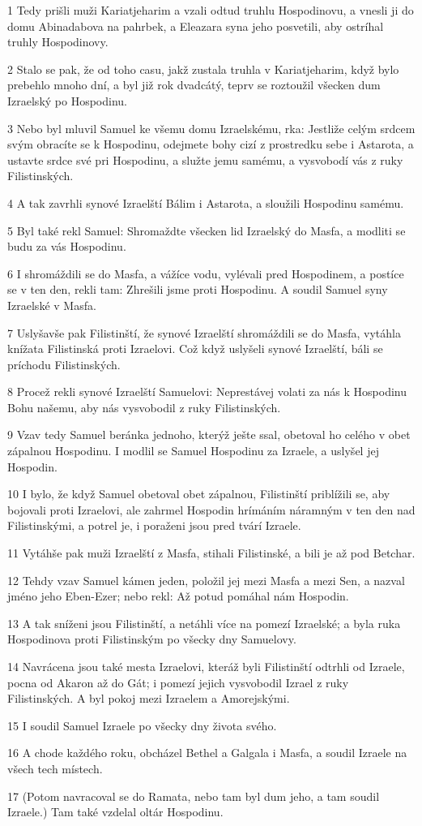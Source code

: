 \par 1 Tedy prišli muži Kariatjeharim a vzali odtud truhlu Hospodinovu, a vnesli ji do domu Abinadabova na pahrbek, a Eleazara syna jeho posvetili, aby ostríhal truhly Hospodinovy.
\par 2 Stalo se pak, že od toho casu, jakž zustala truhla v Kariatjeharim, když bylo prebehlo mnoho dní, a byl již rok dvadcátý, teprv se roztoužil všecken dum Izraelský po Hospodinu.
\par 3 Nebo byl mluvil Samuel ke všemu domu Izraelskému, rka: Jestliže celým srdcem svým obracíte se k Hospodinu, odejmete bohy cizí z prostredku sebe i Astarota, a ustavte srdce své pri Hospodinu, a služte jemu samému, a vysvobodí vás z ruky Filistinských.
\par 4 A tak zavrhli synové Izraelští Bálim i Astarota, a sloužili Hospodinu samému.
\par 5 Byl také rekl Samuel: Shromaždte všecken lid Izraelský do Masfa, a modliti se budu za vás Hospodinu.
\par 6 I shromáždili se do Masfa, a vážíce vodu, vylévali pred Hospodinem, a postíce se v ten den, rekli tam: Zhrešili jsme proti Hospodinu. A soudil Samuel syny Izraelské v Masfa.
\par 7 Uslyšavše pak Filistinští, že synové Izraelští shromáždili se do Masfa, vytáhla knížata Filistinská proti Izraelovi. Což když uslyšeli synové Izraelští, báli se príchodu Filistinských.
\par 8 Procež rekli synové Izraelští Samuelovi: Neprestávej volati za nás k Hospodinu Bohu našemu, aby nás vysvobodil z ruky Filistinských.
\par 9 Vzav tedy Samuel beránka jednoho, kterýž ješte ssal, obetoval ho celého v obet zápalnou Hospodinu. I modlil se Samuel Hospodinu za Izraele, a uslyšel jej Hospodin.
\par 10 I bylo, že když Samuel obetoval obet zápalnou, Filistinští priblížili se, aby bojovali proti Izraelovi, ale zahrmel Hospodin hrímáním náramným v ten den nad Filistinskými, a potrel je, i poraženi jsou pred tvárí Izraele.
\par 11 Vytáhše pak muži Izraelští z Masfa, stihali Filistinské, a bili je až pod Betchar.
\par 12 Tehdy vzav Samuel kámen jeden, položil jej mezi Masfa a mezi Sen, a nazval jméno jeho Eben-Ezer; nebo rekl: Až potud pomáhal nám Hospodin.
\par 13 A tak sníženi jsou Filistinští, a netáhli více na pomezí Izraelské; a byla ruka Hospodinova proti Filistinským po všecky dny Samuelovy.
\par 14 Navrácena jsou také mesta Izraelovi, kteráž byli Filistinští odtrhli od Izraele, pocna od Akaron až do Gát; i pomezí jejich vysvobodil Izrael z ruky Filistinských. A byl pokoj mezi Izraelem a Amorejskými.
\par 15 I soudil Samuel Izraele po všecky dny života svého.
\par 16 A chode každého roku, obcházel Bethel a Galgala i Masfa, a soudil Izraele na všech tech místech.
\par 17 (Potom navracoval se do Ramata, nebo tam byl dum jeho, a tam soudil Izraele.) Tam také vzdelal oltár Hospodinu.

